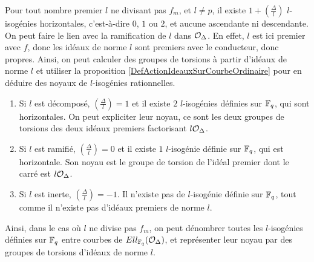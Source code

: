 \begin{Rem}
	Pour tout nombre premier $l$ ne divisant pas $f_{m}$, et $l\neq p$, il existe $1 + \left( \frac{\Delta}{l}\right)$ $l$-isogénies horizontales, c'est-à-dire $0$, $1$ ou $2$, et aucune ascendante ni descendante. On peut faire le lien avec la ramification de $l$ dans $\mathcal{O}_{\Delta}$. En effet, $l$ est ici premier avec $f$, donc les idéaux de norme $l$ sont premiers avec le conducteur, donc propres. Ainsi, on peut calculer des groupes de torsions à partir d'idéaux de norme $l$ et utiliser la proposition \ref{DefActionIdeauxSurCourbeOrdinaire} pour en déduire des noyaux de $l$-isogénies rationnelles. 
	\begin{enumerate}
		\item Si $l$ est décomposé, $\left( \frac{\Delta}{l}\right) = 1$ et il existe $2$ $l$-isogénies définies sur $\mathbb{F}_q$, qui sont horizontales. On peut expliciter leur noyau, ce sont les deux groupes de torsions des deux idéaux premiers factorisant $l\mathcal{O}_{\Delta}$.
		
		\item Si $l$ est ramifié, $\left( \frac{\Delta}{l}\right) = 0$ et il existe $1$ $l$-isogénie définie sur $\mathbb{F}_q$, qui est horizontale. Son noyau est le groupe de torsion de l'idéal premier dont le carré est $l\mathcal{O}_{\Delta}$.
		
		\item Si $l$ est inerte, $\left( \frac{\Delta}{l}\right) = -1$. Il n'existe pas de $l$-isogénie définie sur $\mathbb{F}_q$, tout comme il n'existe pas d'idéaux premiers de norme $l$.
	\end{enumerate}

	Ainsi, dans le cas où $l$ ne divise pas $f_m$, on peut dénombrer toutes les $l$-isogénies définies sur $\mathbb{F}_q$ entre courbes de $Ell_{\mathbb{F}_{q}}(\mathcal{O}_{\Delta})$, et représenter leur noyau par des groupes de torsions d'idéaux de norme $l$.  
\end{Rem}